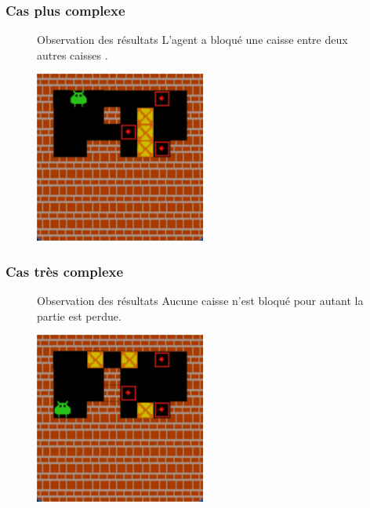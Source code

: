 \documentclass[
	11pt, %
]{beamer}
\begin{document}
\begin{frame}
    \frametitle{Cas plus complexe}
    \begin{figure}
        \centering
        \begin{block}{Observation des résultats}
			\small L'agent a bloqué une caisse entre deux autres caisses .
		\end{block}
        \includegraphics[width=0.5\textwidth]{Images/sokoban_cas_2.png}

    \end{figure}
\end{frame}
\begin{frame}
    \frametitle{Cas très complexe}
    \begin{figure}
        \centering
        \begin{block}{Observation des résultats}
			\small Aucune caisse n'est bloqué pour autant la partie est perdue.
		\end{block}
        \includegraphics[width=0.5\textwidth]{Images/sokoban_cas_3.png}

    \end{figure}
\end{frame}
\end{document}
